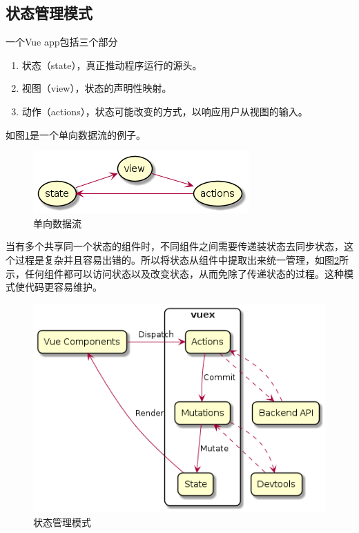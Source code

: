 \subsection{状态管理模式}

一个Vue app包括三个部分
\begin{enumerate}
  \item 状态（state），真正推动程序运行的源头。
  \item 视图（view），状态的声明性映射。
  \item 动作（actions），状态可能改变的方式，以响应用户从视图的输入。
\end{enumerate}

如图\ref{vuex-one-way-data-flow}是一个单向数据流的例子。

\begin{figure}[H]
  \centering
  \includegraphics[scale = 0.6]{out/uml/部署图/vuex-one-way-data-flow/vuex-one-way-data-flow.png}
  \caption{\song\wuhao 单向数据流}
  \label{vuex-one-way-data-flow}
\end{figure}

当有多个共享同一个状态的组件时，不同组件之间需要传递装状态去同步状态，这个过程是复杂并且容易出错的。所以将状态从组件中提取出来统一管理，如图\ref{vuex-state-management-pattern}所示，任何组件都可以访问状态以及改变状态，从而免除了传递状态的过程。这种模式使代码更容易维护。

\begin{figure}[H]
  \centering
  \includegraphics[scale = 0.5]{out/uml/部署图/vuex-state-management-pattern/vuex-state-management-pattern.png}
  \caption{\song\wuhao 状态管理模式}
  \label{vuex-state-management-pattern}
\end{figure}

